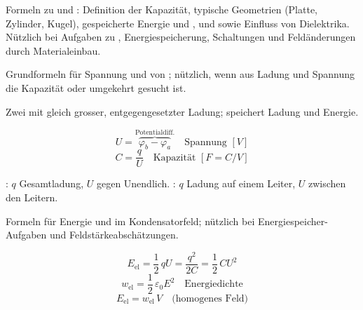 

\begin{runintext}
Formeln zu  und : Definition der Kapazität, typische Geometrien (Platte, Zylinder, Kugel), gespeicherte Energie und ,  und  sowie Einfluss von Dielektrika. Nützlich bei Aufgaben zu , Energiespeicherung, Schaltungen und Feldänderungen durch Materialeinbau.
\end{runintext}

\begin{runintext}
Grundformeln für Spannung und  von ; nützlich, wenn aus Ladung und Spannung die Kapazität oder umgekehrt gesucht ist.
\end{runintext}
\begin{defbox}[Kondensator]
Zwei  mit gleich grosser, entgegengesetzter Ladung; speichert Ladung und Energie.
\end{defbox}
\begin{formulabox}
\[ U = \overbrace{\varphi_b - \varphi_a}^{\text{Potentialdiff.}} \quad \text{Spannung } [\si{V}] \]
\formulasep
\[ C = \frac{q}{U} \quad \text{Kapazität } [\si{F} = \si{C/V}] \]
\end{formulabox}
\begin{runintext}
: $q$ Gesamtladung, $U$ gegen Unendlich. : $q$ Ladung auf einem Leiter, $U$ zwischen den Leitern.
\end{runintext}


\begin{runintext}
Formeln für Energie und  im Kondensatorfeld; nützlich bei Energiespeicher-Aufgaben und Feldstärkeabschätzungen.
\end{runintext}
\begin{formulabox}
\[ E_{\mathrm{el}} = \frac{1}{2}\,qU = \frac{q^2}{2C} = \frac{1}{2}\,CU^2 \]
\formulasep
\[ w_{\mathrm{el}} = \frac{1}{2}\,\varepsilon_0 E^2 \quad \text{Energiedichte} \]
\[ E_{\mathrm{el}} = w_{\mathrm{el}}\,V \quad \text{(homogenes Feld)} \]
\end{formulabox}

